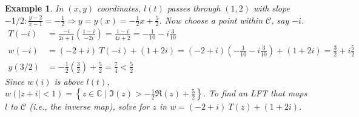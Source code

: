 \documentclass{article}
\newtheorem{example}[theorem]{Example}
\theoremstyle{definition}
\begin{document}
\begin{example}
\begin{minipage}{0.3\textwidth}
    \end{minipage} \vspace{1em}

    In $(x, y)$ coordinates, $l(t)$ passes through $(1, 2)$ with slope $-1/2: \frac{y-2}{x-1} = -\frac{1}{2} \Longrightarrow y = y(x) = -\frac{1}{2}x + \frac{5}{2}$. Now choose a point within $\mathcal{C}$, say $-i$.
    \begin{align*}
        T(-i) &= \frac{-i}{2i+1} \left( \frac{1-i}{-2i} \right) = \frac{1-i}{4i+2} = -\frac{1}{10} - i \frac{3}{10} \\
        w(-i) &= (-2 + i)\ T(-i) + (1+2i) = (-2 + i) \left( -\frac{1}{10} - i \frac{3}{10} \right) + (1 + 2i) = \frac{3}{2} + i \frac{5}{2} \\
        y(3/2) &= -\frac{1}{2} \left( \frac{3}{2} \right) + \frac{5}{2} = \frac{7}{4} < \frac{5}{2}
    \end{align*}
    Since $w(i)$ is above $l(t)$, $w(|z+i| < 1) = \left\{ z \in \mathbb{C} \mid \Im(z) > - \frac{1}{2} \Re(z) + \frac{5}{2} \right\}$. To find an LFT that maps $l$ to $\mathcal{C}$ (i.e., the inverse map), solve for $z$ in $w = (-2 + i)\ T(z) + (1+2i)$.
\end{example}
\end{document}
